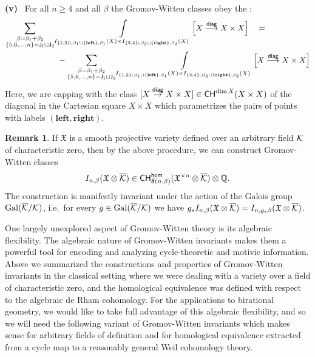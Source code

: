 \documentclass[twoside,leqno]{article}
\numberwithin{equation}{section}
\theoremstyle{plain}
\theoremstyle{definition}
\newtheorem{remark}[equation]{Remark}
\begin{document}
\medskip

\noindent
{\bfseries (v)} \ For all $n \geq 4$ and all $\beta$ the Gromov-Witten classes obey the :
\[
\begin{aligned}
\sum_{\substack{\beta = \beta_{1}+ \beta_{2} \\ \{5,6,\ldots, n\} = \mathsf{J_{1}}\sqcup \mathsf{J}_{2}}} &
\int_{I_{\{1,2\}\sqcup \mathsf{J}_{1}\sqcup \{\mathbf{left}\},\beta_{1}}(X)\times I_{\{3,4\}\sqcup \mathsf{J}_{2}\sqcup \{\mathbf{right}\},\beta_{2}}(X)}\displaylimits \left[X \stackrel{\mathsf{diag}}{\longrightarrow} X\times X\right] \quad = \\ & \
- \sum_{\substack{\beta = \beta_{1}+ \beta_{2} \\ \{5,6,\ldots, n\} = \mathsf{J_{1}}\sqcup \mathsf{J}_{2}}} 
\int_{I_{\{1,3\}\sqcup \mathsf{J}_{1}\sqcup \{\mathbf{left}\},\beta_{1}}(X)\times I_{\{2,4\}\sqcup \mathsf{J}_{2}\sqcup \{\mathbf{right}\},\beta_{2}}(X)}\displaylimits \left[X \stackrel{\mathsf{diag}}{\longrightarrow} X\times X\right]
\end{aligned}
\]
Here, we are capping with the class $[X \stackrel{\mathsf{diag}}{\to} X\times X] \in 
\mathsf{CH}^{\dim X}(X\times X)$ of the diagonal in the Cartesian square $X\times X$ which parametrizes the pairs of points with labels 
$(\mathbf{left},\mathbf{right})$.

\begin{remark} \label{rem:nonclosedL} If $\mathfrak{X}$ is a smooth projective variety  defined over an arbitrary field $\mathcal K$ of characteristic zero, then by the above procedure, we can construct Gromov-Witten classes 
\[
I_{n,\beta}(\mathfrak{X}\otimes \overline{\mathcal K}) \in \mathsf{CH}^{\mathsf{hom}}_{\boldsymbol{\delta}(n,\beta)}(\mathfrak{X}^{\times n}\otimes\overline{\mathcal K})\otimes \mathbb Q.
\]
The construction  is manifestly invariant under the action of the Galois group $\operatorname{Gal}(\overline{\mathcal K}/\mathcal K)$, i.e.\ for every $g \in \operatorname{Gal}(\overline{\mathcal K}/\mathcal K)$
we have $g_{*}I_{n,\beta}(\mathfrak{X}\otimes \overline{\mathcal K}) = I_{n,g_{*}\beta}(\mathfrak{X}\otimes \overline{\mathcal K})$. 
\end{remark}

\medskip


One largely unexplored aspect of Gromov-Witten theory is its algebraic flexibility.  The algebraic nature of Gromov-Witten invariants makes them a powerful tool for encoding and analyzing cycle-theoretic and motivic information. Above we summarized the constructions and properties of Gromov-Witten invariants in the classical setting where we were dealing with a variety over a field of characteristic zero, and the homological equivalence was defined with respect to the algebraic de Rham cohomology. For the applications to birational geometry, we would like to  take full advantage of this algebraic flexibility,  and so we will need the  following variant of Gromov-Witten invariants which makes sense for arbitrary fields of definition and for homological equivalence extracted from a cycle map to a reasonably general Weil cohomology theory.
\end{document}
